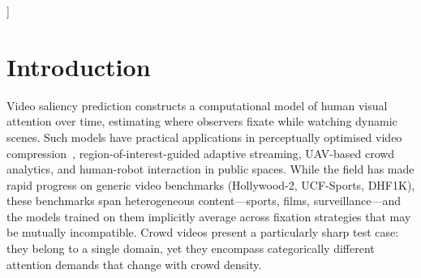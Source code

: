 \documentclass[twocolumn]{article}
\begin{document}
\begin{center}
\begin{minipage}{0.92\linewidth}
\begin{abstract}
regularisation-dominated regime.
Debiased evaluation---subtracting the mean training fixation density from
predictions to remove shared centre-prior alignment---reveals that the
unconditioned backbone loses 45\% of its NSS while \ourmodel{} loses only
17\%, yielding a debiased conditioning gain of $\Delta\mathrm{NSS}\!=\!+0.462$
($3.7\!\times$ the standard gain): density conditioning replaces centre-prior
exploitation with crowd-content-responsive predictions.
These results articulate a general design principle: in constrained
crowd-video data regimes, targeted inductive bias via lightweight conditional
bottleneck modulation is strictly superior to generic capacity scaling.
      \end{abstract}
    \end{minipage}
    \vspace{0.3in}
  \end{center}
]

\section{Introduction}
\label{sec:intro}

Video saliency prediction constructs a computational model of human visual
attention over time, estimating where observers fixate while watching dynamic
scenes.  Such models have practical applications in perceptually optimised
video compression~\citep{le2010}, region-of-interest-guided adaptive
streaming, UAV-based crowd analytics, and human-robot interaction in public
spaces.  While the field has made rapid progress on generic video benchmarks
(Hollywood-2, UCF-Sports, DHF1K), these benchmarks span heterogeneous
content---sports, films, surveillance---and the models trained on them
implicitly average across fixation strategies that may be mutually
incompatible.  Crowd videos present a particularly sharp test case: they
belong to a single domain, yet they encompass categorically different
attention demands that change with crowd density.
\end{document}
